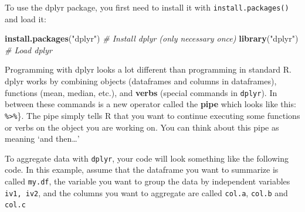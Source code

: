 \documentclass[]{book}
\newenvironment{Shaded}{\begin{snugshade}}{\end{snugshade}}
\newcommand{\KeywordTok}[1]{\textcolor[rgb]{0.13,0.29,0.53}{\textbf{#1}}}
\newcommand{\DataTypeTok}[1]{\textcolor[rgb]{0.13,0.29,0.53}{#1}}
\newcommand{\DecValTok}[1]{\textcolor[rgb]{0.00,0.00,0.81}{#1}}
\newcommand{\StringTok}[1]{\textcolor[rgb]{0.31,0.60,0.02}{#1}}
\newcommand{\CommentTok}[1]{\textcolor[rgb]{0.56,0.35,0.01}{\textit{#1}}}
\newcommand{\OperatorTok}[1]{\textcolor[rgb]{0.81,0.36,0.00}{\textbf{#1}}}
\newcommand{\NormalTok}[1]{#1}
\theoremstyle{definition}
\theoremstyle{definition}
\theoremstyle{remark}
\begin{document}
To use the dplyr package, you first need to install it with
\texttt{install.packages()} and load it:

\begin{Shaded}
\begin{Highlighting}[]
\KeywordTok{install.packages}\NormalTok{(}\StringTok{"dplyr"}\NormalTok{)     }\CommentTok{# Install dplyr (only necessary once)}
\KeywordTok{library}\NormalTok{(}\StringTok{"dplyr"}\NormalTok{)              }\CommentTok{# Load dplyr}
\end{Highlighting}
\end{Shaded}

Programming with dplyr looks a lot different than programming in
standard R. dplyr works by combining objects (dataframes and columns in
dataframes), functions (mean, median, etc.), and \textbf{verbs} (special
commands in \texttt{dplyr}). In between these commands is a new operator
called the \textbf{pipe} which looks like this:
\texttt{\%\textgreater{}\%}\}. The pipe simply tells R that you want to
continue executing some functions or verbs on the object you are working
on. You can think about this pipe as meaning `and then\ldots{}'

To aggregate data with \texttt{dplyr}, your code will look something
like the following code. In this example, assume that the dataframe you
want to summarize is called \texttt{my.df}, the variable you want to
group the data by independent variables \texttt{iv1,\ iv2}, and the
columns you want to aggregate are called \texttt{col.a}, \texttt{col.b}
and \texttt{col.c}

\begin{Shaded}
\end{Shaded}
\end{document}
